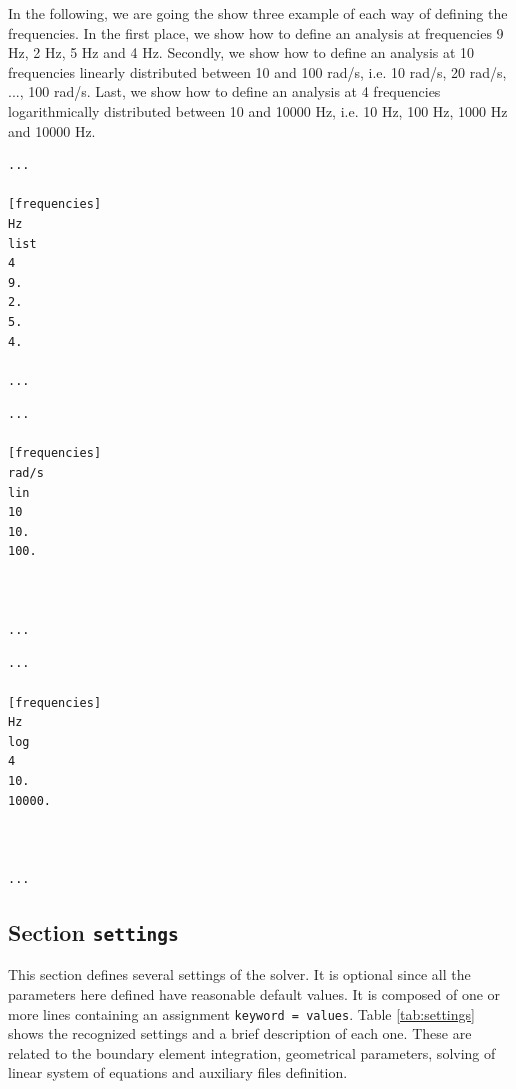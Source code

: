 \documentclass[a4paper,fleqn]{book}
\begin{document}
In the following, we are going the show three example of each way of defining the frequencies. In the first place, we show how to define an analysis at frequencies 9 Hz, 2 Hz, 5 Hz and 4 Hz. Secondly, we show how to define an analysis at 10 frequencies linearly distributed between 10 and 100 rad/s, i.e. 10 rad/s, 20 rad/s, ..., 100 rad/s. Last, we show how to define an analysis at 4 frequencies logarithmically distributed between 10 and 10000 Hz, i.e. 10 Hz, 100 Hz, 1000 Hz and 10000 Hz.
\begin{center}
\begin{minipage}{0.32\textwidth}
\begin{Verbatim}[frame=single, fontsize=\small, label=input.dat (example of list)]
...

[frequencies]
Hz
list
4
9.
2.
5.
4.

...
\end{Verbatim}
\end{minipage}
\begin{minipage}{0.32\textwidth}
\begin{Verbatim}[frame=single, fontsize=\small, label=input.dat (example of lin)]
...

[frequencies]
rad/s
lin
10
10.
100.



...
\end{Verbatim} 
\end{minipage}
\begin{minipage}{0.32\textwidth}
\begin{Verbatim}[frame=single, fontsize=\small, label=input.dat (example of log)]
...

[frequencies]
Hz
log
4
10.
10000.



...
\end{Verbatim} 
\end{minipage}
\end{center}

\subsection{Section \texttt{settings}}

\label{sec:settings}

This section defines several settings of the solver. It is optional since all the parameters here defined have reasonable default values. It is composed of one or more lines containing an assignment \texttt{keyword = values}. Table \ref{tab:settings} shows the recognized settings and a brief description of each one. These are related to the boundary element integration, geometrical parameters, solving of linear system of equations and auxiliary files definition. 
\end{document}
